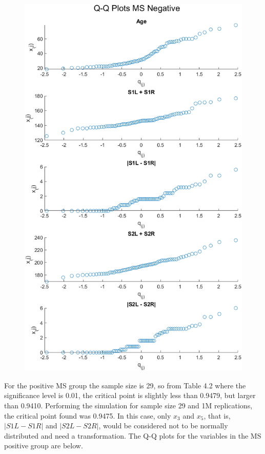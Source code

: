 \begin{center}
    \begin{figure}[H]
        \centering
        \includegraphics[scale=0.6]{./matlab/chapter-4/sol4.31.qq.msneg.png}
    \end{figure}
\end{center}

For the positive MS group the sample size is 29, so from Table 4.2 where the significance level is 0.01, the critical point is slightly less than 0.9479, but larger than 0.9410. Performing the simulation for sample size 29 and 1M replications, the critical point found was 0.9475. In this case, only $x_{3}$ and $x_{5}$, that is, $\left|S1L - S1R\right|$ and $\left|S2L - S2R\right|$, would be considered not to be normally distributed and need a transformation. The Q-Q plots for the variables in the MS positive group are below.


